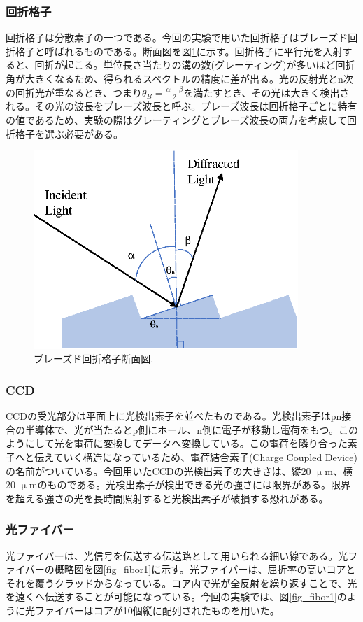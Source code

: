 \documentclass[11pt,a4j]{jsarticle}
\begin{document}
\newpage
\subsubsection{回折格子}
回折格子は分散素子の一つである。今回の実験で用いた回折格子はブレーズド回折格子と呼ばれるものである。断面図を図\ref{fig_grating1}に示す\cite{Grating}。回折格子に平行光を入射すると、回折が起こる。単位長さ当たりの溝の数(グレーティング)が多いほど回折角が大きくなるため、得られるスペクトルの精度に差が出る。光の反射光とn次の回折光が重なるとき、つまり$\theta_{B}=\frac{\alpha-\beta}{2}$を満たすとき、その光は大きく検出される。その光の波長をブレーズ波長と呼ぶ。ブレーズ波長は回折格子ごとに特有の値であるため、実験の際はグレーティングとブレーズ波長の両方を考慮して回折格子を選ぶ必要がある。

\begin{figure}[h]
 \centering
 \includegraphics[clip,width=10cm]{grating.eps}
 \caption{ブレーズド回折格子断面図.}
 \label{fig_grating1}
\end{figure}

\subsubsection{CCD}
CCDの受光部分は平面上に光検出素子を並べたものである。光検出素子はpn接合の半導体で、光が当たるとp側にホール、n側に電子が移動し電荷をもつ。このようにして光を電荷に変換してデータへ変換している。この電荷を隣り合った素子へと伝えていく構造になっているため、電荷結合素子(Charge Coupled Device)の名前がついている\cite{CCD}。今回用いたCCDの光検出素子の大きさは、縦20 $\upmu$m、横20 $\upmu$mのものである。光検出素子が検出できる光の強さには限界がある。限界を超える強さの光を長時間照射すると光検出素子が破損する恐れがある。%

\newpage
\subsubsection{光ファイバー}
光ファイバーは、光信号を伝送する伝送路として用いられる細い線である。光ファイバーの概略図を図\ref{fig_fibor1}に示す。光ファイバーは、屈折率の高いコアとそれを覆うクラッドからなっている。コア内で光が全反射を繰り返すことで、光を遠くへ伝送することが可能になっている\cite{Fibor}。今回の実験では、図\ref{fig_fibor1}のように光ファイバーはコアが10個縦に配列されたものを用いた。
\end{document}
